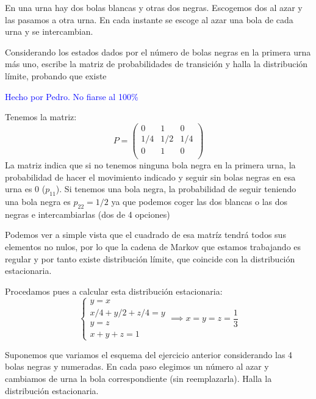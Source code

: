 \begin{problem}[9]
	En una urna hay dos bolas blancas y otras dos negras. Escogemos dos al azar y las pasamos a otra urna. En cada instante se escoge al azar una bola de cada urna y se intercambian.

	Considerando los estados dados por el número de bolas negras en la primera urna más uno, escribe la matriz de probabilidades de transición y halla la distribución límite, probando que existe

	\solution

	\textcolor{blue}{Hecho por Pedro. No fiarse al 100\%}

	Tenemos la matriz:
	\[P= \left( \begin{matrix}
	0&1&0\\
	1/4&1/2&1/4\\
	0&1&0\\
	\end{matrix}\right)\]
	La matriz indica que si no tenemos ninguna bola negra en la primera urna, la probabilidad de hacer el movimiento indicado y seguir sin bolas negras en esa urna es 0 ($p_{11}$). Si tenemos una bola negra, la probabilidad de seguir teniendo una bola negra es $p_{22}=1/2$ ya que podemos coger las dos blancas o las dos negras e intercambiarlas (dos de 4 opciones)

	Podemos ver a simple vista que el cuadrado de esa matríz tendrá todos sus elementos no nulos, por lo que la cadena de Markov que estamos trabajando es regular y por tanto existe distribución límite, que coincide con la distribución estacionaria.

	Procedamos pues a calcular esta distribución estacionaria:
	\[\begin{cases}
		 y=x\\
		 x/4+y/2+z/4=y\\
		 y=z\\
		 x+y+z=1
	\end{cases} \implies x=y=z=\frac{1}{3}\]
\end{problem}

\begin{problem}[10]
	Suponemos que variamos el esquema del ejercicio anterior considerando las 4 bolas negras y numeradas. En cada paso elegimos un número al azar y cambiamos de urna la bola correspondiente (sin reemplazarla). Halla la distribución estacionaria.
	\solution
\end{problem}

\begin{problem}[11]

	\solution
\end{problem}

\begin{problem}[12]

	\solution
\end{problem}

\begin{problem}[13]

	\solution
\end{problem}

\begin{problem}[14]

	\solution
\end{problem}

\begin{problem}[15]

	\solution
\end{problem}